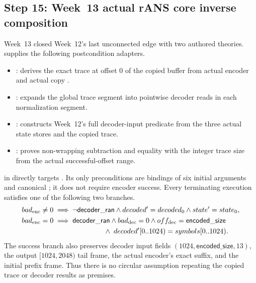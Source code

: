 \subsection{Step 15: Week~13 actual rANS core inverse composition}

Week~13 closed Week~12's last unconnected edge with two authored theories.
\allowbreak{} supplies
the following postcondition adapters.

\begin{itemize}
  \item {}: derives the exact trace at
        offset 0 of the copied buffer from actual encoder
         and actual copy .
  \item {}\allowbreak
        : expands the global trace segment
        into pointwise decoder reads in each normalization segment.
  \item {}\allowbreak
        : constructs Week~12's full decoder-input
        predicate from the three actual state stores and the copied trace.
  \item {}: proves non-wrapping
         subtraction and equality with the integer trace size
        from the actual successful-offset range.
\end{itemize}

\begin{verified}
\label{thm:actual-rans-core-inverse}
 in
 directly targets
. Its only preconditions are bindings
of six initial arguments and canonical ;
it does not require encoder success. Every terminating execution satisfies one
of the following two branches.
\[
\begin{aligned}
  bad_{\mathrm{enc}}\ne0&\;\Longrightarrow\;
    \neg\mathsf{decoder\_ran}\land
    decoded'=decoded_0\land state'=state_0,\\
  bad_{\mathrm{enc}}=0&\;\Longrightarrow\;
    \mathsf{decoder\_ran}\land bad_{\mathrm{dec}}=0
    \land off_{\mathrm{dec}}=\mathsf{encoded\_size}\\
  &\hspace{7.2em}\land\;
    decoded'[0..1024)=symbols[0..1024).
\end{aligned}
\]
The success branch also preserves decoder input fields
\((1024,\mathsf{encoded\_size},13)\), the output \([1024,2048)\) tail frame,
the actual encoder's exact suffix, and the initial prefix frame. Thus there is
no circular assumption repeating the copied trace or decoder results as premises.
\end{verified}


